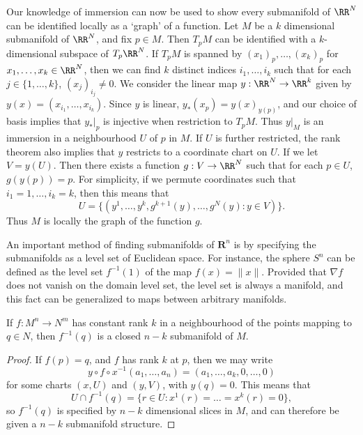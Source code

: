 \begin{example}
    Our knowledge of immersion can now be used to show every submanifold of $\RR^N$ can be identified locally as a `graph' of a function. Let $M$ be a $k$ dimensional submanifold of $\RR^N$, and fix $p \in M$. Then $T_p M$ can be identified with a $k$-dimensional subspace of $T_p \RR^N$. If $T_p M$ is spanned by $(x_1)_p, \dots, (x_k)_p$ for $x_1, \dots, x_k \in \RR^N$, then we can find $k$ distinct indices $i_1, \dots, i_k$ such that for each $j \in \{ 1, \dots, k \}$, $(x_j)_{i_j} \neq 0$. We consider the linear map $y: \RR^N \to \RR^k$ given by $y(x) = (x_{i_1}, \dots, x_{i_k})$. Since $y$ is linear, $y_*(x_p) = y(x)_{y(p)}$, and our choice of basis implies that $y_*|_p$ is injective when restriction to $T_p M$. Thus $y|_M$ is an immersion in a neighbourhood $U$ of $p$ in $M$. If $U$ is further restricted, the rank theorem also implies that $y$ restricts to a coordinate chart on $U$. If we let $V = y(U)$. Then there exists a function $g: V \to \RR^N$ such that for each $p \in U$, $g(y(p)) = p$. For simplicity, if we permute coordinates such that $i_1 = 1, \dots, i_k = k$, then this means that
    \[ U = \{ (y^1, \dots, y^k, g^{k+1}(y), \dots, g^N(y): y \in V) \}. \]
    Thus $M$ is locally the graph of the function $g$.
\end{example}

An important method of finding submanifolds of $\mathbf{R}^n$ is by specifying the submanifolds as a level set of Euclidean space. For instance, the sphere $S^n$ can be defined as the level set $f^{-1}(1)$ of the map $f(x) = \| x \|$. Provided that $\nabla f$ does not vanish on the domain level set, the level set is always a manifold, and this fact can be generalized to maps between arbitrary manifolds.

\begin{theorem}
    If $f: M^n \to N^m$ has constant rank $k$ in a neighbourhood of the points mapping to $q \in N$, then $f^{-1}(q)$ is a closed $n - k$ submanifold of $M$.
\end{theorem}
\begin{proof}
    If $f(p) = q$, and $f$ has rank $k$ at $p$, then we may write
    \[ y \circ f \circ x^{-1}(a_1, \dots, a_n) = (a_1, \dots, a_k, 0 ,\dots, 0) \]
    for some charts $(x,U)$ and $(y,V)$, with $y(q) = 0$. This means that
    \[ U \cap f^{-1}(q) = \{ r \in U : x^1(r) = \dots = x^k(r) = 0 \}, \]
    so $f^{-1}(q)$ is specified by $n-k$ dimensional slices in $M$, and can therefore be given a $n-k$ submanifold structure.
\end{proof}

